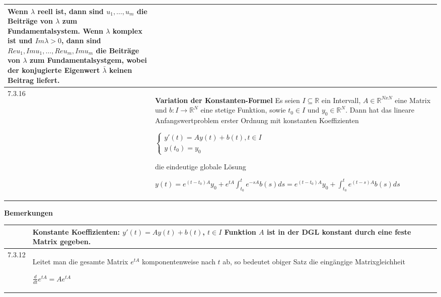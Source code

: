 \begin{table}[H]
\begin{tabularx}{\textwidth}{X m{16cm}}
                Wenn $\lambda$ reell ist, dann sind $u_1, \dots, u_m$ die Beiträge von $\lambda$ zum Fundamentalsystem. \hfill \break
                Wenn $\lambda$ komplex ist und $Im\lambda > 0$, dann sind $Reu_1, Imu_1,\dots,Reu_m, Imu_m$ die Beiträge von $\lambda$ zum
                Fundamentalsystgem, wobei der konjugierte Eigenwert $\bar{\lambda}$ keinen Beitrag liefert.\\
        \midrule
        7.3.16& \textbf{Variation der Konstanten-Formel} \hfill \break
                Es seien $I \subseteq \mathbb{R}$ ein Intervall, $A \in \mathbb{R}^{NxN}$ eine Matrix und $b: I \rightarrow \mathbb{R}^N$ eine 
                stetige Funktion, sowie $t_0 \in I$ und $y_0 \in \mathbb{R}^N$. Dann hat das lineare Anfangswertproblem erster Ordnung mit
                konstanten Koeffizienten \hfill \break
                \centerline{$   \begin{cases}
                                y'(t) = Ay(t) +b(t), t \in I \\
                                y(t_0) = y_0
                                \end{cases} $}
                die eindeutige globale Lösung \hfill \break
                \centerline{$ y(t) = e^{(t-t_0)A}y_0 + e^{tA} \int^t_{t_0} e^{-sA}b(s) ds = e^{(t-t_0)A}y_0 + \int^t_{t_0} e^{(t-s)A}b(s) ds $}\\
        \bottomrule
    \end{tabularx}
    \end{table}

    \noindent
    \textbf{Bemerkungen}
    \begin{table}[H]
    \begin{tabularx}{\textwidth}{X m{16cm}}
        \toprule

              & Konstante Koeffizienten: $y'(t) = Ay(t) + b(t)$, $t \in I$ \hfill \break
                Funktion $A$ ist in der DGL konstant durch eine feste Matrix gegeben. \\
        \midrule
        7.3.12& Leitet man die gesamte Matrix $e^{tA}$ komponentenweise nach $t$ ab, so bedeutet obiger Satz die eingängige Matrixgleichheit
                \hfill \break \centerline{$ \frac{d}{dt}e^{tA} = A e^{tA} $} \\

        \bottomrule
    \end{tabularx}
    \end{table}

    \pagebreak

